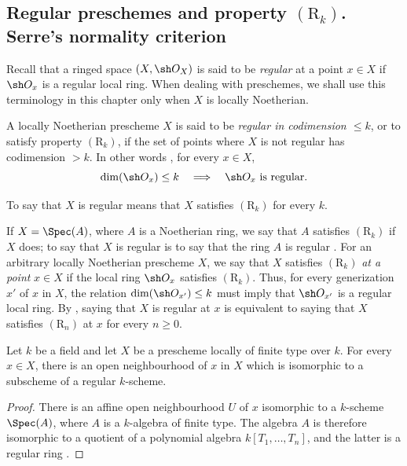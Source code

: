 \subsection{Regular preschemes and property
\texorpdfstring{$(\mathrm{R}_k)$}{(Rk)}. Serre's normality criterion}
\label{subsection:IV.5.8}

\begin{env}[5.8.1]
\label{IV.5.8.1}
Recall  that a ringed space $(X,\sh O_X)$ is said
to be \emph{regular} at a point $x\in X$ if $\sh O_x$ is a regular
local ring.  When dealing with preschemes, we shall use this
terminology in this chapter only when $X$ is locally Noetherian.
\end{env}

\begin{definition}[5.8.2]
\label{IV.5.8.2}
A locally Noetherian prescheme $X$ is said to be \emph{regular in
codimension $\leq k$}, or to satisfy property $(\mathrm R_k)$, if the
set of points where $X$ is not regular has codimension $>k$.  In other
words , for every $x\in X$,
\[
  \dim(\sh O_x)\leq k
  \quad\Longrightarrow\quad
  \sh O_x\ \text{is regular}.
\]
\end{definition}

To say that $X$ is regular means that $X$ satisfies $(\mathrm R_k)$
for every $k$.

If $X=\Spec(A)$, where $A$ is a Noetherian ring, we say that $A$
satisfies $(\mathrm R_k)$ if $X$ does; to say that $X$ is regular is
to say that the ring $A$ is regular .  For an
arbitrary locally Noetherian prescheme $X$, we say that $X$ satisfies
$(\mathrm R_k)$ \emph{at a point} $x\in X$ if the local ring
$\sh O_x$ satisfies $(\mathrm R_k)$.  Thus, for every generization
$x'$ of $x$ in $X$, the relation
$\dim(\sh O_{x'})\leq k$ must imply that $\sh O_{x'}$ is a regular
local ring.  By , saying that $X$ is regular at
$x$ is equivalent to saying that $X$ satisfies $(\mathrm R_n)$ at
$x$ for every $n\geq0$.

\begin{proposition}[5.8.3]
\label{IV.5.8.3}
Let $k$ be a field and let $X$ be a prescheme locally of finite type
over $k$.  For every $x\in X$, there is an open neighbourhood of $x$
in $X$ which is isomorphic to a subscheme of a regular $k$-scheme.
\end{proposition}

\begin{proof}
There is an affine open neighbourhood $U$ of $x$ isomorphic to a
$k$-scheme $\Spec(A)$, where $A$ is a $k$-algebra of finite type.
The algebra $A$ is therefore isomorphic to a quotient of a polynomial
algebra $k[T_1,\ldots,T_n]$, and the latter is a regular ring
.
\end{proof}

